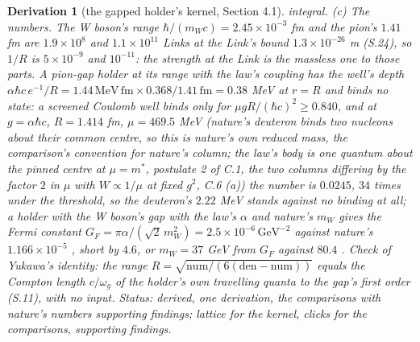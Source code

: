 \documentclass[pdflatex,sn-mathphys-num]{sn-jnl}
\newcommand{\num}{\mathrm{num}}
\newcommand{\den}{\mathrm{den}}
\theoremstyle{thmstyleone}
\newtheorem{derivation}{Derivation}
\begin{document}
\begin{derivation}[the gapped holder's kernel, Section 4.1]
integral. (c) \emph{The numbers.} The W boson's range $\hbar / (m_W c) = 2.45 \times 10^{-3}$ fm and the pion's $1.41$ fm are $1.9 \times 10^8$ and $1.1 \times 10^{11}$ Links at the Link's bound $1.3 \times 10^{-26}$ m (S.24), so $1 / R$ is $5 \times 10^{-9}$ and $10^{-11}$: the strength at the Link is the massless one to those parts. A pion-gap holder at its range with the law's coupling has the well's depth $\alpha\hbar c\,e^{-1} / R = 1.44\,\mathrm{MeV\,fm} \times 0.368 / 1.41\,\mathrm{fm} = 0.38$ MeV at $r = R$ and binds no state: a screened Coulomb well binds only for $\mu g R / (\hbar c)^2 \ge 0.840$, and at $g = \alpha\hbar c$, $R = 1.414$ fm, $\mu = 469.5$ MeV (nature's deuteron binds two nucleons about their common centre, so this is nature's own reduced mass, the comparison's convention for nature's column; the law's body is one quantum about the pinned centre at $\mu = m^*$, postulate 2 of C.1, the two columns differing by the factor $2$ in $\mu$ with $W \propto 1 / \mu$ at fixed $g^2$, C.6 (a)) the number is $0.0245$, $34$ times under the threshold, so the deuteron's $2.22$ MeV stands against no binding at all; a holder with the W boson's gap with the law's $\alpha$ and nature's $m_W$ gives the Fermi constant $G_F = \pi\alpha / (\sqrt 2\,m_W^2) = 2.5 \times 10^{-6}\,\mathrm{GeV}^{-2}$ against nature's $1.166 \times 10^{-5}$ \cite{pdg}, short by $4.6$, or $m_W = 37$ GeV from $G_F$ against $80.4$ \cite{pdg}. \emph{Check of Yukawa's identity:} the range $R = \sqrt{\num / (6(\den - \num))}$ equals the Compton length $c / \omega_g$ of the holder's own travelling quanta to the gap's first order (S.11), with no input. \emph{Status:} derived, one derivation, the comparisons with nature's numbers supporting findings; lattice for the kernel, clicks for the comparisons, supporting findings.
\end{derivation}
\end{document}
